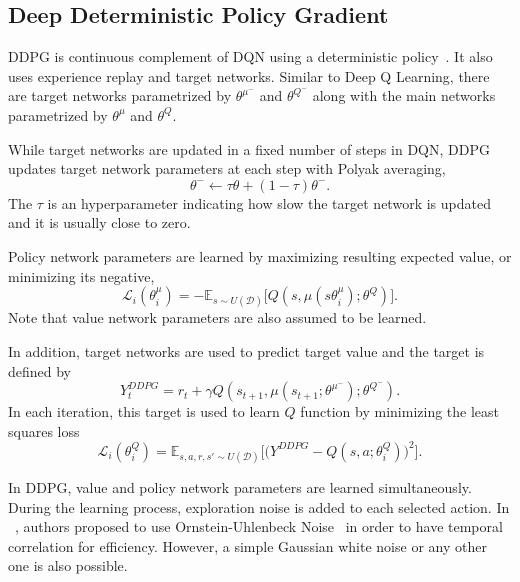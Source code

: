 \documentclass[a4paper, 12pt]{article} %
\begin{document}
\subsection{Deep Deterministic Policy Gradient}
DDPG is continuous complement of DQN using a deterministic policy~\cite{lillicrap_continuous_2019}. 
It also uses experience replay and target networks. 
Similar to Deep Q Learning, there are target networks parametrized by $\theta^{\mu^-}$ and $\theta^{Q^-}$ 
along with the main networks parametrized by $\theta^{\mu}$ and $\theta^{Q}$. 

While target networks are updated in a fixed number of steps in DQN, 
DDPG updates target network parameters at each step with Polyak averaging, 
\begin{equation}
\label{eqn:target_update}
\theta^- \leftarrow \tau \theta + (1-\tau) \theta^- .
\end{equation}
The $\tau$ is an hyperparameter indicating how slow the target network is updated and it is usually close to zero. 

Policy network parameters are learned by maximizing resulting expected value, or minimizing its negative,
\begin{equation}
\label{eqn:ddpg_policy_loss}
\mathcal{L}_i(\theta^\mu_i) = -\mathbb{E}_{s \sim U(\mathcal{D})} \Big[ Q(s, \mu(s\theta^\mu_i);\theta^Q) \Big].
\end{equation} 
Note that value network parameters are also assumed to be learned. 

In addition, target networks are used to predict target value and the target is defined by 
\begin{equation}
\label{eqn:ddpg_target}
Y_t^{DDPG} = r_t + \gamma Q(s_{t+1}, \mu(s_{t+1};\theta^{\mu^-});\theta^{Q^-}).
\end{equation}
In each iteration, this target is used to learn $Q$ function by minimizing the least squares loss 
\begin{equation}
\label{eqn:ddpg_loss}
\mathcal{L}_i(\theta^Q_i) = \mathbb{E}_{s,a,r,s'\sim U(\mathcal{D})}\Big[\big( Y^{DDPG} - Q(s,a;\theta^Q_i) \big) ^ 2 \Big].
\end{equation}

In DDPG, value and policy network parameters are learned simultaneously. 
During the learning process, exploration noise is added to each selected action. 
In ~\cite{lillicrap_continuous_2019}, authors proposed to use Ornstein-Uhlenbeck Noise~\cite{uhlenbeck_theory_1930} in order to have temporal correlation for efficiency. 
However, a simple Gaussian white noise or any other one is also possible. 
\end{document}
